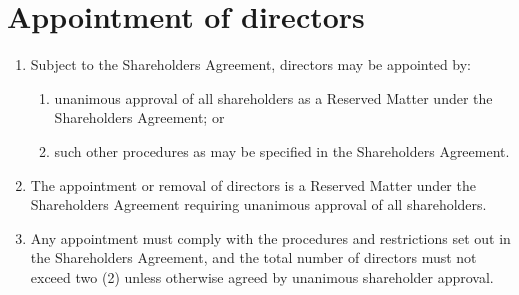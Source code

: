 \section{Appointment of directors}

\begin{enumerate}[label=(\alph*)]
    \item Subject to the Shareholders Agreement, directors may be appointed by:
    \begin{enumerate}[label=(\roman*)]
        \item unanimous approval of all shareholders as a Reserved Matter under the Shareholders Agreement; or
        \item such other procedures as may be specified in the Shareholders Agreement.
    \end{enumerate}
    
    \item The appointment or removal of directors is a Reserved Matter under the Shareholders Agreement requiring unanimous approval of all shareholders.
    
    \item Any appointment must comply with the procedures and restrictions set out in the Shareholders Agreement, and the total number of directors must not exceed two (2) unless otherwise agreed by unanimous shareholder approval.
\end{enumerate} 
